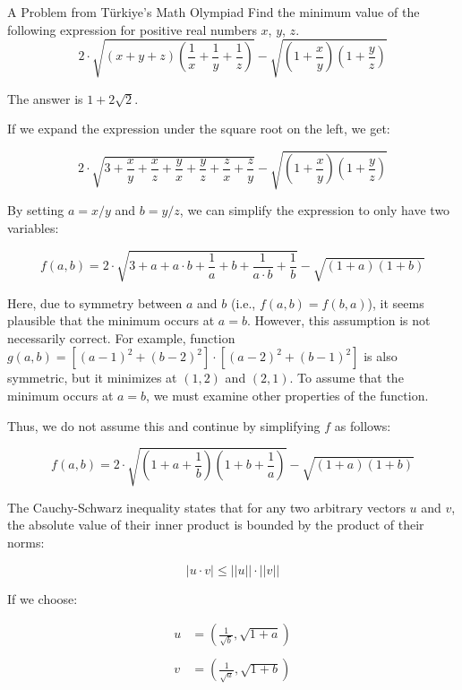 \begin{problem}{}{A Problem from Türkiye's Math Olympiad}
Find the minimum value of the following expression for positive real numbers $x$, $y$, $z$.
$$
2 \cdot \sqrt{(x + y + z) \left(\frac{1}{x} + \frac{1}{y} + \frac{1}{z} \right)} - \sqrt{\left(1 + \frac{x}{y} \right) \left(1 + \frac{y}{z} \right)}
$$
\end{problem}

\begin{solution}
The answer is $1 + 2 \sqrt{2}$.

If we expand the expression under the square root on the left, we get:

\[
2 \cdot \sqrt{3 + \frac{x}{y} + \frac{x}{z} + \frac{y}{x} + \frac{y}{z} + \frac{z}{x} + \frac{z}{y}} - \sqrt{\left(1 + \frac{x}{y} \right) \left(1 + \frac{y}{z} \right)}
\]

By setting $a = x/y$ and $b = y/z$, we can simplify the expression to only have two variables:

\[
f(a, b) = 2 \cdot \sqrt{3 + a + a \cdot b + \frac{1}{a} + b + \frac{1}{a \cdot b} + \frac{1}{b}} - \sqrt{(1 + a) (1 + b)}
\]

Here, due to symmetry between $a$ and $b$ (i.e., $f(a,b) = f(b,a)$), it seems plausible that the minimum occurs at $a = b$. However, this assumption is not necessarily correct. For example,  function $g(a,b) = [(a-1)^2+(b-2)^2]\cdot[(a-2)^2+(b-1)^2]$ is also symmetric, but it minimizes at $(1,2)$ and $(2,1)$. To assume that the minimum occurs at $a=b$, we must examine other properties of the function.

Thus, we do not assume this and continue by simplifying $f$ as follows:

\[
f(a, b) = 2 \cdot \sqrt{\left(1 + a + \frac{1}{b}\right)\left(1 + b + \frac{1}{a}\right)} - \sqrt{(1 + a) (1 + b)}
\]

The Cauchy-Schwarz inequality states that for any two arbitrary vectors $u$ and $v$, the absolute value of their inner product is bounded by the product of their norms:

\[
|u \cdot v| \leq ||u|| \cdot ||v||
\]

If we choose:

\[
\begin{aligned}
u &= \left(\frac{1}{\sqrt{b}}, \sqrt{1+a}\right) \\\\
v &= \left(\frac{1}{\sqrt{a}}, \sqrt{1+b}\right)
\end{aligned} 
\]


\end{solution}
